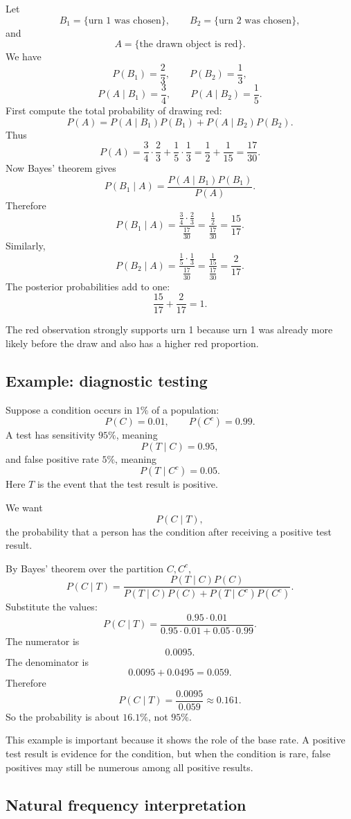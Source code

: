 Let
\[
B_1=\{\text{urn 1 was chosen}\},\qquad B_2=\{\text{urn 2 was chosen}\},
\]
and
\[
A=\{\text{the drawn object is red}\}.
\]
We have
\[
P(B_1)=\frac23,\qquad P(B_2)=\frac13,
\]
\[
P(A\mid B_1)=\frac34,\qquad P(A\mid B_2)=\frac15.
\]
First compute the total probability of drawing red:
\[
P(A)=P(A\mid B_1)P(B_1)+P(A\mid B_2)P(B_2).
\]
Thus
\[
P(A)=\frac34\cdot\frac23+\frac15\cdot\frac13
=\frac12+\frac1{15}=\frac{17}{30}.
\]
Now Bayes' theorem gives
\[
P(B_1\mid A)=\frac{P(A\mid B_1)P(B_1)}{P(A)}.
\]
Therefore
\[
P(B_1\mid A)=\frac{\frac34\cdot\frac23}{\frac{17}{30}}
=\frac{\frac12}{\frac{17}{30}}
=\frac{15}{17}.
\]
Similarly,
\[
P(B_2\mid A)=\frac{\frac15\cdot\frac13}{\frac{17}{30}}
=\frac{\frac1{15}}{\frac{17}{30}}
=\frac{2}{17}.
\]
The posterior probabilities add to one:
\[
\frac{15}{17}+\frac{2}{17}=1.
\]

The red observation strongly supports urn 1 because urn 1 was already more
likely before the draw and also has a higher red proportion.

\subsection*{Example: diagnostic testing}

Suppose a condition occurs in \(1\%\) of a population:
\[
P(C)=0.01,\qquad P(C^c)=0.99.
\]
A test has sensitivity \(95\%\), meaning
\[
P(T\mid C)=0.95,
\]
and false positive rate \(5\%\), meaning
\[
P(T\mid C^c)=0.05.
\]
Here \(T\) is the event that the test result is positive.

We want
\[
P(C\mid T),
\]
the probability that a person has the condition after receiving a positive test
result.

By Bayes' theorem over the partition \(C,C^c\),
\[
P(C\mid T)=
\frac{P(T\mid C)P(C)}{P(T\mid C)P(C)+P(T\mid C^c)P(C^c)}.
\]
Substitute the values:
\[
P(C\mid T)=
\frac{0.95\cdot0.01}{0.95\cdot0.01+0.05\cdot0.99}.
\]
The numerator is
\[
0.0095.
\]
The denominator is
\[
0.0095+0.0495=0.059.
\]
Therefore
\[
P(C\mid T)=\frac{0.0095}{0.059}\approx0.161.
\]
So the probability is about \(16.1\%\), not \(95\%\).

This example is important because it shows the role of the base rate. A positive
test result is evidence for the condition, but when the condition is rare, false
positives may still be numerous among all positive results.

\subsection*{Natural frequency interpretation}

